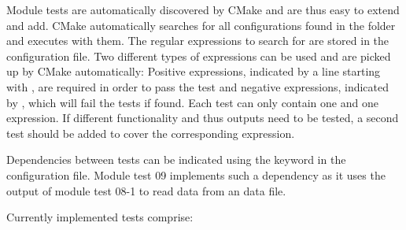 Module tests are automatically discovered by CMake and are thus easy to extend and add.
CMake automatically searches for all configurations found in the  folder and executes \apsq with them.
The regular expressions to search for are stored in the configuration file.
Two different types of expressions can be used and are picked up by CMake automatically: Positive expressions, indicated by a line starting with , are required in order to pass the test and negative expressions, indicated by , which will fail the tests if found.
Each test can only contain one  and one  expression.
If different functionality and thus outputs need to be tested, a second test should be added to cover the corresponding expression.

Dependencies between tests can be indicated using the  keyword in the configuration file.
Module test 09 implements such a dependency as it uses the output of module test 08-1 to read data from an \apsq data file.

Currently implemented tests comprise:

